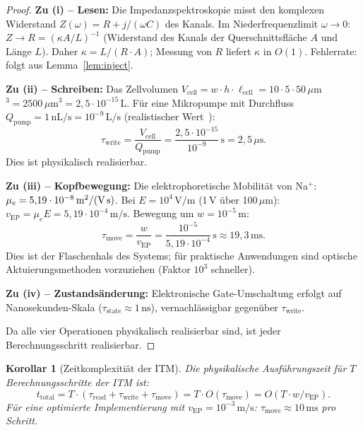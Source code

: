 ﻿\documentclass[a4paper,12pt]{article}
\theoremstyle{plain}
\newtheorem{korollar}{Korollar}
\theoremstyle{definition}
\theoremstyle{remark}
\begin{document}
\begin{proof}
\textbf{Zu (i) -- Lesen:}
Die Impedanzspektroskopie misst den komplexen Widerstand $Z(\omega) = R + j/(\omega C)$
des Kanals. Im Niederfrequenzlimit $\omega \to 0$: $Z \to R = (\kappa A/L)^{-1}$
(Widerstand des Kanals der Querschnittsfl\"ache $A$ und L\"ange $L$).
Daher $\kappa = L/(R \cdot A)$; Messung von $R$ liefert $\kappa$ in $O(1)$.
Fehlerrate: folgt aus Lemma~\ref{lem:inject}.

\textbf{Zu (ii) -- Schreiben:}
Das Zellvolumen $V_{\mathrm{cell}} = w \cdot h \cdot \ell_{\mathrm{cell}} = 10 \cdot 5 \cdot 50\,\mu$m$^3
= 2500\,\mu$m$^3 = 2{,}5 \cdot 10^{-15}$\,L.
F\"ur eine Mikropumpe mit Durchfluss $Q_{\mathrm{pump}} = 1\,\text{nL/s} = 10^{-9}\,\text{L/s}$
(realistischer Wert~\cite{laser2004}):
\[
\tau_{\mathrm{write}} = \frac{V_{\mathrm{cell}}}{Q_{\mathrm{pump}}}
= \frac{2{,}5 \cdot 10^{-15}}{10^{-9}}\,\text{s} = 2{,}5\,\mu\text{s}.
\]
Dies ist physikalisch realisierbar.

\textbf{Zu (iii) -- Kopfbewegung:}
Die elektrophoretische Mobilit\"at von Na$^+$:
$\mu_e = 5{,}19 \cdot 10^{-8}\,\text{m}^2/(\text{V\,s})$.
Bei $E = 10^4\,\text{V/m}$ (1\,V \"uber 100\,$\mu$m):
$v_{\mathrm{EP}} = \mu_e E = 5{,}19 \cdot 10^{-4}\,\text{m/s}$.
Bewegung um $w = 10^{-5}\,\text{m}$:
\[
\tau_{\mathrm{move}} = \frac{w}{v_{\mathrm{EP}}} = \frac{10^{-5}}{5{,}19 \cdot 10^{-4}}\,\text{s}
\approx 19{,}3\,\text{ms}.
\]
Dies ist der Flaschenhals des Systems; f\"ur praktische Anwendungen
sind optische Aktuierungsmethoden vorzuziehen (Faktor $10^3$ schneller).

\textbf{Zu (iv) -- Zustands\"anderung:}
Elektronische Gate-Umschaltung erfolgt auf Nanosekunden-Skala
($\tau_{\mathrm{state}} \approx 1\,\text{ns}$), vernachl\"assigbar gegen\"uber
$\tau_{\mathrm{write}}$.

Da alle vier Operationen physikalisch realisierbar sind, ist jeder
Berechnungsschritt realisierbar.
\end{proof}

\begin{korollar}[Zeitkomplexiti\"at der ITM]
\label{kor:zeitkompl}
Die physikalische Ausf\"uhrungszeit f\"ur $T$ Berechnungsschritte der ITM ist:
\[
t_{\mathrm{total}} = T \cdot (\tau_{\mathrm{read}} + \tau_{\mathrm{write}} + \tau_{\mathrm{move}})
= T \cdot O(\tau_{\mathrm{move}}) = O(T \cdot w / v_{\mathrm{EP}}).
\]
F\"ur eine optimierte Implementierung mit $v_{\mathrm{EP}} = 10^{-3}\,\text{m/s}$:
$\tau_{\mathrm{move}} \approx 10\,\text{ms}$ pro Schritt.
\end{korollar}
\end{document}

